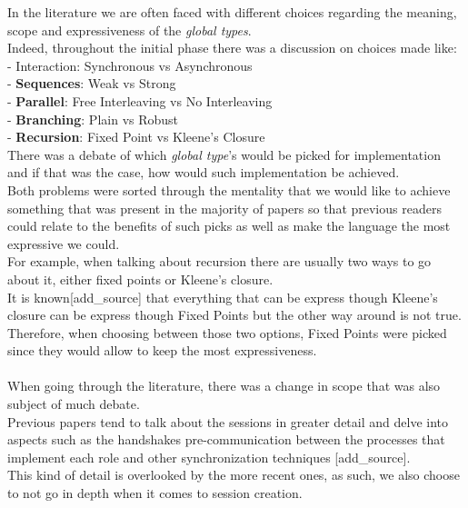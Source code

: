 \normalsize
In the literature we are often faced with different choices regarding the meaning, scope and expressiveness of the \textit{global types}.\\
Indeed, throughout the initial phase there was a discussion on choices made like:\\
- Interaction: Synchronous vs Asynchronous\\
- \textbf{Sequences}: Weak vs Strong\\
- \textbf{Parallel}: Free Interleaving vs No Interleaving\\
- \textbf{Branching}: Plain vs Robust\\
- \textbf{Recursion}: Fixed Point vs Kleene's Closure\\
There was a debate of which \textit{global type}'s would be picked for implementation and if that was the case, how would such implementation be achieved.\\
Both problems were sorted through the mentality that we would like to achieve something that was present in the majority of papers so that previous readers could relate to the benefits of such picks as well as make the language the most expressive we could.\\
For example, when talking about recursion there are usually two ways to go about it, either fixed points or Kleene's closure.\\
It is known[add\_source] that everything that can be express though Kleene's closure can be express though Fixed Points but the other way around is not true.\\
Therefore, when choosing between those two options, Fixed Points were picked since they would allow to keep the most expressiveness.\\
\\
When going through the literature, there was a change in scope that was also subject of much debate.\\
Previous papers tend to talk about the sessions in greater detail and delve into aspects such as the handshakes pre-communication between the processes that implement each role and other synchronization techniques [add\_source].\\
This kind of detail is overlooked by the more recent ones, as such, we also choose to not go in depth when it comes to session creation.